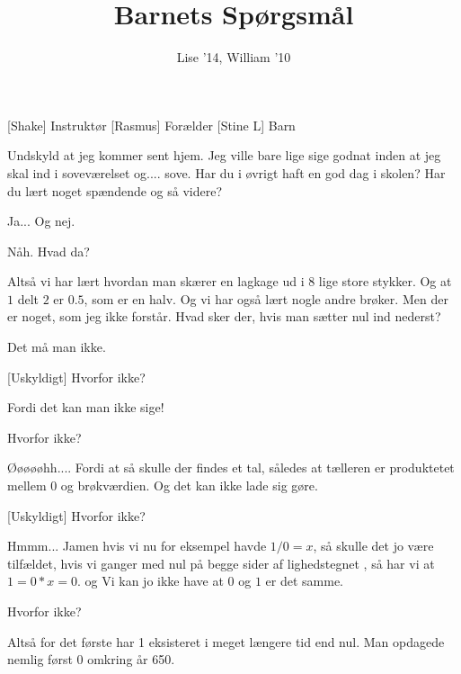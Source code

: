 \documentclass[a4paper,11pt]{article}
\title{Barnets Spørgsmål}
\author{Lise '14, William '10}
\begin{document}
\maketitle

\begin{roles}
[Shake] Instruktør
[Rasmus] Forælder
[Stine L] Barn
\end{roles}


\begin{sketch}

 Undskyld at jeg kommer sent hjem. Jeg ville bare lige sige godnat inden at jeg skal ind i soveværelset og.... sove. Har du i øvrigt haft en god dag i skolen? Har du lært noget spændende og så videre?

 Ja... Og nej.

 Nåh. Hvad da?

 Altså vi har lært hvordan man skærer en lagkage ud i $8$ lige store stykker. Og at $1$ delt $2$ er $0.5$, som er en halv. Og vi har også lært nogle andre brøker. Men der er noget, som jeg ikke forstår. Hvad sker der, hvis man sætter nul ind nederst?

 Det må man ikke.

[Uskyldigt] Hvorfor ikke?

 Fordi det kan man ikke sige!

  Hvorfor ikke?

 Øøøøøhh.... Fordi at så skulle der findes et tal, således at tælleren er produktetet mellem 0 og brøkværdien. Og det kan ikke lade sig gøre. 

[Uskyldigt] Hvorfor ikke?

 Hmmm... Jamen hvis vi nu for eksempel havde $1/0=x$, så skulle det jo være tilfældet, hvis vi ganger med nul på begge sider af lighedstegnet , så har vi at $1=0*x=0$. og Vi kan jo ikke have at $0$ og $1$ er det samme. 

 Hvorfor ikke?

 Altså for det første har 1 eksisteret i meget længere tid end nul. Man opdagede nemlig først 0 omkring år 650.


\end{sketch}
\end{document}
